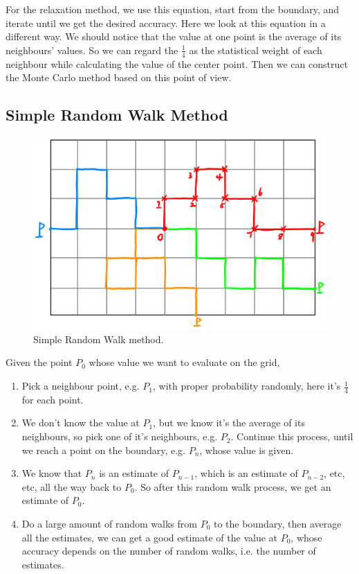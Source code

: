 \documentclass[aps, prl, reprint, groupedaddress]{revtex4-1}
\begin{document}
For the relaxation method, we use this equation, start from the boundary, and iterate until we get the desired accuracy. Here we look at this equation in a different way. We should notice that the value at one point is the average of its neighbours' values. So we can regard the $\frac{1}{4}$ as the statistical weight of each neighbour while calculating the value of the center point. Then we can construct the Monte Carlo method based on this point of view.

\subsection{Simple Random Walk Method}

\begin{figure}[htbp]
    \centering
    \includegraphics[width=.4\textwidth]{./figs/srw}
    \caption{\label{fig:srw} Simple Random Walk method.}
\end{figure}

Given the point $P_0$ whose value we want to evaluate on the grid,
\begin{enumerate}
    \item Pick a neighbour point, e.g. $P_1$, with proper probability randomly, here it's $\frac{1}{4}$ for each point.
    \item We don't know the value at $P_1$, but we know it's the average of its neighbours, so pick one of it's neighbours, e.g. $P_2$. Continue this process, until we reach a point on the boundary, e.g. $P_n$, whose value is given.
    \item We know that $P_n$ is an estimate of $P_{n-1}$, which is an estimate of $P_{n-2}$, etc, etc, all the way back to $P_0$. So after this random walk process, we get an estimate of $P_0$.
    \item Do a large amount of random walks from $P_0$ to the boundary, then average all the estimates, we can get a good estimate of the value at $P_0$, whose accuracy depends on the number of random walks, i.e. the number of estimates.
\end{enumerate}

\end{document}
